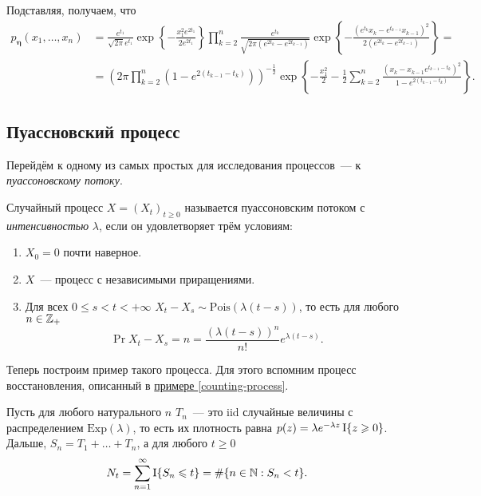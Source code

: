 Подставляя, получаем, что
\begin{align*}
	p_{\bm{\eta}}(x_{1}, \dots, x_{n}) &=\frac{e^{t_{1}}}{\sqrt{2\pi}e^{t_{1}}} 
	\exp\left\{-\frac{x_{1}^{2}e^{2t_{1}}}{2e^{2t_{1}}}\right\}\prod_{k = 
	2}^{n} \frac{e^{t_{k}}}{\sqrt{2\pi(e^{2t_{k}} - e^{2t_{k - 1}})}} 
	\exp\left\{-\frac{(e^{t_{k}}x_{k} - e^{t_{k - 1}}x_{k - 1})^{2}} 
	{2(e^{2t_{k}} - e^{2t_{k - 1}})}\right\} = \\
	&= \left(2\pi\prod_{k = 2}^{n}\left(1 - e^{2(t_{k - 1} - 
	t_{k})}\right)\right)^{-\frac{1}{2}}\exp\left\{-\frac{x_{1}^{2}}{2} - 
	\frac{1}{2}\sum_{k = 2}^{n}\frac{(x_{k} - x_{k - 1}e^{t_{k - 1} - 
	t_{k}})^{2}}{1 - e^{2(t_{k - 1} - t_{k})}}\right\}.
\end{align*}

\subsection{Пуассновский процесс}
Перейдём к одному из самых простых для исследования процессов~--- к 
\emph{пуассоновскому потоку}.
\begin{definition}\label{poisson-process-def}
	Случайный процесс \(X = (X_{t})_{t \geq 0}\) называется пуассоновским 
	потоком с \emph{интенсивностью} \(\lambda\), если он удовлетворяет трём 
	условиям:
	\begin{enumerate}
		\item \(X_{0} = 0\) почти наверное.
		\item \(X\)~--- процесс с независимыми приращениями.
		\item Для всех \(0 \leq s < t < +\infty\) \(X_{t} - X_{s} \sim 
		\mathrm{Pois}(\lambda(t - s))\), то есть для любого \(n \in \mathbb{Z}_{+}\)
		\[
			\Pr{X_{t} - X_{s} = n} = \frac{(\lambda(t - 
			s))^{n}}{n!}e^{\lambda(t - s)}.
		\]
	\end{enumerate}
\end{definition}

Теперь построим пример такого процесса. Для этого вспомним процесс 
восстановления, описанный в \hyperref[counting-process]{примере 
\ref*{counting-process}}.

Пусть для любого натурального \(n\) \(T_{n}\)~--- это iid случайные величины с 
распределением \(\mathrm{Exp}(\lambda)\), то есть их плотность равна \(p(z) = 
\lambda e^{-\lambda z}\operatorname{\mathrm{I}}\{z \geqslant 0\}\). Дальше, \(S_{n} = T_{1} + \ldots + 
T_{n}\), а для любого \(t \geq 0\)
\[
	N_{t} = \sum_{n = 1}^{\infty} \operatorname{\mathrm{I}}\{S_{n} \leqslant t\} = \#\{n \in \mathbb{N} : S_{n} < 
	t\}.
\]

